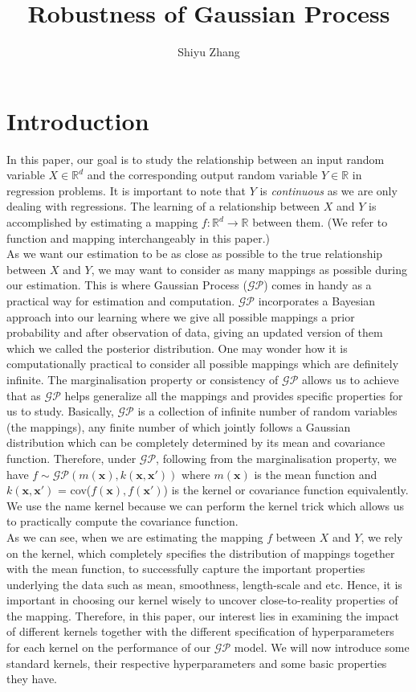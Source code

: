 \documentclass{article}
\title{Robustness of Gaussian Process}
\author{Shiyu Zhang }
\date{}
\begin{document}
\maketitle

\section{Introduction}
In this paper, our goal is to study the relationship between an input random variable $X \in \mathbb{R}^d$  and the corresponding output random variable $Y \in \mathbb{R}$ in regression problems. It is important to note that $Y$ is \emph{continuous} as we are only dealing with regressions. The learning of a relationship between $X$ and $Y$ is accomplished by estimating a mapping $f\colon \mathbb{R}^{d} \to \mathbb{R}$ between them. (We refer to function and mapping interchangeably in this paper.) \vspace{5mm}\\
As we want our estimation to be as close as possible to the true relationship between $X$ and $Y$, we may want to consider as many mappings as possible during our estimation. This is where Gaussian Process ($\mathcal{GP}$) comes in handy as a practical way for estimation and computation. $\mathcal{GP}$ incorporates a Bayesian approach into our learning where we give all possible mappings a prior probability and after observation of data, giving an updated version of them which we called the posterior distribution. One may wonder how it is computationally practical to consider all possible mappings which are definitely infinite. The marginalisation property or consistency of $\mathcal{GP}$ allows us to achieve that as $\mathcal{GP}$ helps generalize all the mappings and provides specific properties for us to study. Basically, $\mathcal{GP}$ is a collection of infinite number of random variables (the mappings), any finite number of which jointly follows a Gaussian distribution which can be completely determined by its mean and covariance function. Therefore, under $\mathcal{GP}$, following from the marginalisation property, we have $f \sim \mathcal{GP}(m(\mathbf{x}), k(\mathbf{x}, \mathbf{x'}))$ where $m(\mathbf{x})$ is the mean function and $k(\mathbf{x}, \mathbf{x'})$ = cov($f(\mathbf{x}),f(\mathbf{x'})$) is the kernel or covariance function equivalently. We use the name kernel because we can perform the kernel trick which allows us to practically compute the covariance function. \vspace{5mm}\\
As we can see, when we are estimating the mapping $f$ between $X$ and $Y$, we rely on the kernel, which completely specifies the distribution of mappings together with the mean function, to successfully capture the important properties underlying the data such as mean, smoothness, length-scale and etc. Hence, it is important in choosing our kernel wisely to uncover close-to-reality properties of the mapping. Therefore, in this paper, our interest lies in examining the impact of different kernels together with the different specification of hyperparameters for each kernel on the performance of our $\mathcal{GP}$ model. We will now introduce some standard kernels, their respective hyperparameters and some basic properties they have. 
\end{document}
